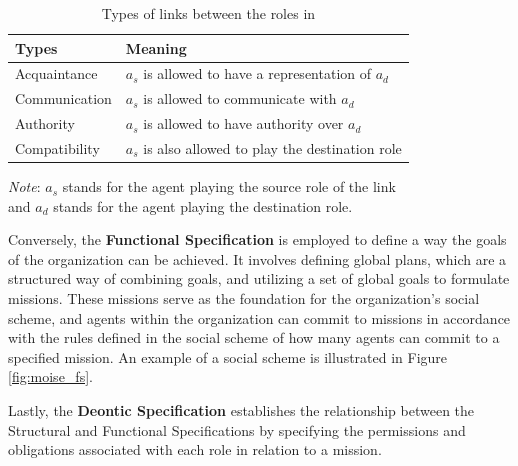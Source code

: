 \def \sourceagent{$a_s$ }
\def \destagent{$a_d$ }

\begin{table}[!htbp]
    \begin{minipage}{\columnwidth}
        \centering
        \begin{tabular}{l l}
            \toprule
            Types         & Meaning                                                        \\
            \midrule
            Acquaintance  & \sourceagent is allowed to have a representation of \destagent \\
            Communication & \sourceagent is allowed to communicate with \destagent         \\
            Authority     & \sourceagent is allowed to have authority over \destagent      \\
            Compatibility & \sourceagent is also allowed to play the destination role      \\
            \bottomrule
        \end{tabular}
        \begin{center}
            \footnotesize
            \emph{Note}: \sourceagent stands for the agent playing the source role of the link \\
            and \destagent stands for the agent playing the destination role. \\
        \end{center}
    \end{minipage}
    \caption{Types of links between the roles in \MOISEp}
    \label{tab:types_of_links_in_moise}
\end{table}

Conversely, the \textbf{Functional Specification} is employed to define a way the goals of the organization can be achieved. It involves defining global plans, which are a structured way of combining goals, and utilizing a set of global goals to formulate missions. These missions serve as the foundation for the organization's social scheme, and agents within the organization can commit to missions in accordance with the rules defined in the social scheme of how many agents can commit to a specified mission. An example of a social scheme is illustrated in Figure \ref{fig:moise_fs}.

Lastly, the \textbf{Deontic Specification} establishes the relationship between the Structural and Functional Specifications by specifying the permissions and obligations associated with each role in relation to a mission.

